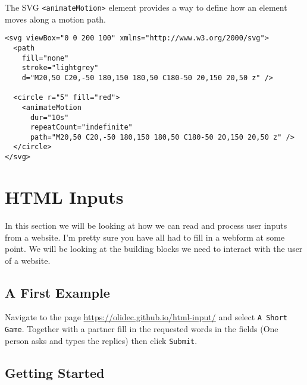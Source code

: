 \documentclass[11pt,a4paper]{report}
\begin{document}
The SVG \verb|<animateMotion>| element provides a way to define how an element moves along a motion path.

\begin{lstlisting}
<svg viewBox="0 0 200 100" xmlns="http://www.w3.org/2000/svg">
  <path
    fill="none"
    stroke="lightgrey"
    d="M20,50 C20,-50 180,150 180,50 C180-50 20,150 20,50 z" />

  <circle r="5" fill="red">
    <animateMotion
      dur="10s"
      repeatCount="indefinite"
      path="M20,50 C20,-50 180,150 180,50 C180-50 20,150 20,50 z" />
  </circle>
</svg>
\end{lstlisting}

\newpage
\section{HTML Inputs}

In this section we will be looking at how we can read and process user inputs from a website. I'm pretty sure you have all had to fill in  a webform at some point. We will be looking at the building blocks we need to interact with the user of a website.

\subsection{A First Example}
\begin{ex}
Navigate to the page \url{https://olidec.github.io/html-input/} and select \verb|A Short Game|. Together with a partner fill in the requested words in the fields (One person asks and types the replies) then click \verb|Submit|. 
\end{ex}


\subsection{Getting Started}
\end{document}
